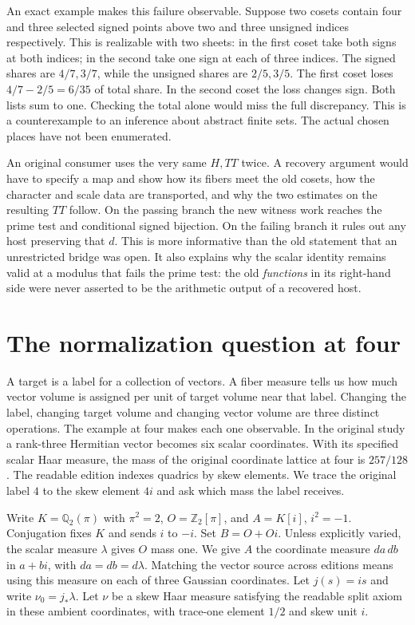 \documentclass[12pt,letterpaper]{article}
\begin{document}
An exact example makes this failure observable. Suppose two cosets contain four and three selected signed points above two and three unsigned indices respectively. This is realizable with two sheets: in the first coset take both signs at both indices; in the second take one sign at each of three indices. The signed shares are $4/7,3/7$, while the unsigned shares are $2/5,3/5$. The first coset loses $4/7-2/5=6/35$ of total share. In the second coset the loss changes sign. Both lists sum to one. Checking the total alone would miss the full discrepancy. This is a counterexample to an inference about abstract finite sets. The actual chosen places have not been enumerated.

An original consumer uses the very same $H,TT$ twice. A recovery argument would have to specify a map and show how its fibers meet the old cosets, how the character and scale data are transported, and why the two estimates on the resulting $TT$ follow. On the passing branch the new witness work reaches the prime test and conditional signed bijection. On the failing branch it rules out any host preserving that $d$. This is more informative than the old statement that an unrestricted bridge was open. It also explains why the scalar identity remains valid at a modulus that fails the prime test: the old \emph{functions} in its right-hand side were never asserted to be the arithmetic output of a recovered host.


\section{The normalization question at four}
A target is a label for a collection of vectors. A fiber measure tells us how much vector volume is assigned per unit of target volume near that label. Changing the label, changing target volume and changing vector volume are three distinct operations. The example at four makes each one observable. In the original study a rank-three Hermitian vector becomes six scalar coordinates. With its specified scalar Haar measure, the mass of the original coordinate lattice at four is $257/128$. The readable edition indexes quadrics by skew elements. We trace the original label $4$ to the skew element $4i$ and ask which mass the label receives.

Write $K=\mathbb Q_2(\pi)$ with $\pi^2=2$, $O=\mathbb Z_2[\pi]$, and $A=K[i]$, $i^2=-1$. Conjugation fixes $K$ and sends $i$ to $-i$. Set $B=O+Oi$. Unless explicitly varied, the scalar measure $\lambda$ gives $O$ mass one. We give $A$ the coordinate measure $da\,db$ in $a+bi$, with $da=db=d\lambda$. Matching the vector source across editions means using this measure on each of three Gaussian coordinates. Let $j(s)=is$ and write $\nu_0=j_*\lambda$. Let $\nu$ be a skew Haar measure satisfying the readable split axiom in these ambient coordinates, with trace-one element $1/2$ and skew unit $i$.
\end{document}
